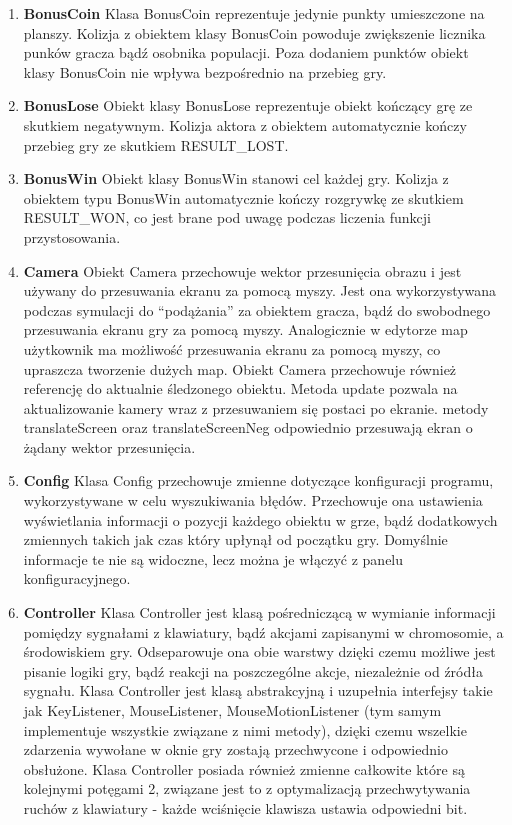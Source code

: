 \begin{par}
\begin{enumerate}
	\item{\bf BonusCoin }\newline
	Klasa BonusCoin reprezentuje jedynie punkty umieszczone na planszy. Kolizja z obiektem klasy BonusCoin powoduje zwiększenie licznika punków gracza bądź osobnika populacji. Poza dodaniem punktów obiekt klasy BonusCoin nie wpływa bezpośrednio na przebieg gry.
	\item{\bf BonusLose }\newline
	Obiekt klasy BonusLose reprezentuje obiekt kończący grę ze skutkiem negatywnym. Kolizja aktora z obiektem automatycznie kończy przebieg gry ze skutkiem RESULT\_LOST.
	\item{\bf BonusWin }\newline
	Obiekt klasy BonusWin stanowi cel każdej gry. Kolizja z obiektem typu BonusWin automatycznie kończy rozgrywkę ze skutkiem RESULT\_WON, co jest brane pod uwagę podczas liczenia funkcji przystosowania.
	\item{\bf Camera }\newline
	Obiekt Camera przechowuje wektor przesunięcia obrazu i jest używany do przesuwania ekranu za pomocą myszy. Jest ona wykorzystywana podczas symulacji do ``podążania'' za obiektem gracza, bądź do swobodnego przesuwania ekranu gry za pomocą myszy. Analogicznie w edytorze map użytkownik ma możliwość przesuwania ekranu za pomocą myszy, co upraszcza tworzenie dużych map. Obiekt Camera przechowuje również referencję do aktualnie śledzonego obiektu.
	Metoda update pozwala na aktualizowanie kamery wraz z przesuwaniem się postaci po ekranie.
	metody translateScreen oraz translateScreenNeg odpowiednio przesuwają ekran o żądany wektor przesunięcia.
	\item{\bf Config }\newline
	Klasa Config przechowuje zmienne dotyczące konfiguracji programu, wykorzystywane w celu wyszukiwania błędów. Przechowuje ona ustawienia wyświetlania informacji o pozycji każdego obiektu w grze, bądź dodatkowych zmiennych takich jak czas który upłynął od początku gry.
	Domyślnie informacje te nie są widoczne, lecz można je włączyć z panelu konfiguracyjnego.
	\item{\bf Controller }\newline
	Klasa Controller jest klasą pośredniczącą w wymianie informacji pomiędzy sygnałami z klawiatury, bądź akcjami zapisanymi w chromosomie, a środowiskiem gry. Odseparowuje ona obie warstwy dzięki czemu możliwe jest pisanie logiki gry, bądź reakcji na poszczególne akcje, niezależnie od źródła sygnału. Klasa Controller jest klasą abstrakcyjną i uzupełnia interfejsy takie jak KeyListener, MouseListener, MouseMotionListener (tym samym implementuje wszystkie związane z nimi metody), dzięki czemu wszelkie zdarzenia wywołane w oknie gry zostają przechwycone i odpowiednio obsłużone. Klasa Controller posiada również zmienne całkowite które są kolejnymi potęgami 2, związane jest to z optymalizacją przechwytywania ruchów z klawiatury - każde wciśnięcie klawisza ustawia odpowiedni bit.

\end{enumerate}
\end{par}
